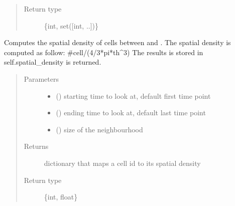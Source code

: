 \documentclass[letterpaper,10pt,english]{sphinxmanual}
\begin{document}
\begin{fulllineitems}
\begin{fulllineitems}
\begin{quote}
\begin{description}
\item[{Return type}] \leavevmode
\{int, set({[}int, ..{]})\}

\end{description}\end{quote}

\end{fulllineitems}


\begin{fulllineitems}
\label{\detokenize{index:LineageTree.lineageTree.compute_spatial_density}}
Computes the spatial density of cells between  and .
The spatial density is computed as follow:
\#cell/(4/3*pi*th\textasciicircum{}3)
The results is stored in self.spatial\_density is returned.
\begin{quote}\begin{description}
\item[{Parameters}] \leavevmode\begin{itemize}
\item {} 
 () \textendash{} starting time to look at, default first time point

\item {} 
 () \textendash{} ending time to look at, default last time point

\item {} 
 () \textendash{} size of the neighbourhood

\end{itemize}

\item[{Returns}] \leavevmode
dictionary that maps a cell id to its spatial density

\item[{Return type}] \leavevmode
\{int, float\}

\end{description}\end{quote}


\end{fulllineitems}
\end{fulllineitems}
\end{document}
